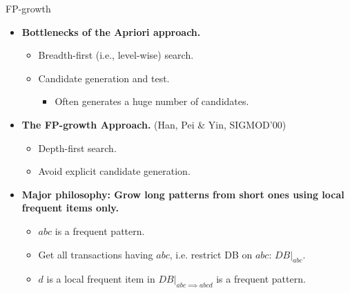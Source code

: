\begin{frame}{FP-growth}
	\begin{itemize}
		\item \textbf{Bottlenecks of the Apriori approach.}
		      \begin{itemize}
			      \item Breadth-first (i.e., level-wise) search.
			      \item Candidate generation and test.
			            \begin{itemize}
				            \item Often generates a huge number of candidates.
			            \end{itemize}
		      \end{itemize}
		\item \textbf{The FP-growth Approach.} (Han, Pei \& Yin, SIGMOD'00)
		      \begin{itemize}
			      \item Depth-first search.
			      \item Avoid explicit candidate generation.
		      \end{itemize}
		\item \textbf{Major philosophy: Grow long patterns from short ones
			      using local frequent items only.}
		      \begin{itemize}
			      \item $abc$ is a frequent pattern.
			      \item Get all transactions having $abc$, i.e. restrict DB on $abc$:
			            $DB|_{abc}$.
			      \item $d$ is a local frequent item in $DB|_{abc \implies abcd}$ is
			            a frequent pattern.
		      \end{itemize}
	\end{itemize}
\end{frame}

